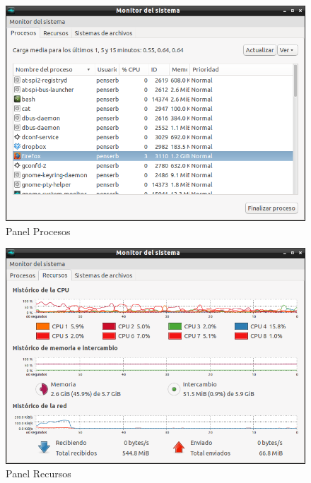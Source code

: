 \documentclass[a4paper,11pt]{article}
\begin{document}
\begin{figure}[H]
  \centering
  \includegraphics[width=1\textwidth]{06linuxMonitorSistemaProcesos}
  \caption{Panel Procesos}
  \label{fig:linuxMonitorSistemaProcesos}
\end{figure}

\begin{figure}[H]
  \centering
  \includegraphics[width=1\textwidth]{07linuxMonitorSistemaRecursos}
  \caption{Panel Recursos}
  \label{fig:linuxMonitorSistemaRecursos}
\end{figure}
\end{document}
